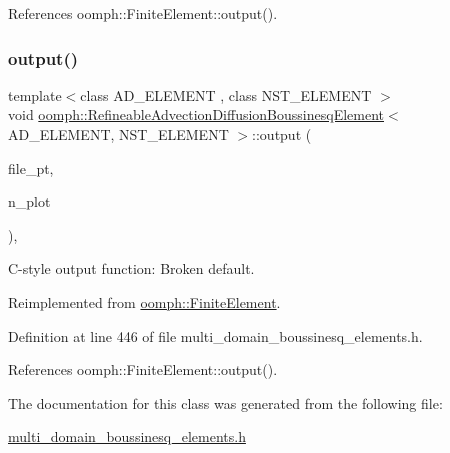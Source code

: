 References oomph\+::\+Finite\+Element\+::output().

\mbox{\label{classoomph_1_1RefineableAdvectionDiffusionBoussinesqElement_a61bcd2e4a50f8e157ca40572b384dcee}} 
\subsubsection{\texorpdfstring{output()}{output()}\hspace{0.1cm}{\footnotesize\ttfamily [4/4]}}
{\footnotesize\ttfamily template$<$class A\+D\+\_\+\+E\+L\+E\+M\+E\+NT , class N\+S\+T\+\_\+\+E\+L\+E\+M\+E\+NT $>$ \\
void \hyperlink{classoomph_1_1RefineableAdvectionDiffusionBoussinesqElement}{oomph\+::\+Refineable\+Advection\+Diffusion\+Boussinesq\+Element}$<$ A\+D\+\_\+\+E\+L\+E\+M\+E\+NT, N\+S\+T\+\_\+\+E\+L\+E\+M\+E\+NT $>$\+::output (\begin{DoxyParamCaption}\item[{F\+I\+LE $\ast$}]{file\+\_\+pt,  }\item[{const unsigned \&}]{n\+\_\+plot }\end{DoxyParamCaption})\hspace{0.3cm}{\ttfamily [inline]}, {\ttfamily [virtual]}}



C-\/style output function\+: Broken default. 



Reimplemented from \hyperlink{classoomph_1_1FiniteElement_adfaee690bb0608f03320eeb9d110d48c}{oomph\+::\+Finite\+Element}.



Definition at line 446 of file multi\+\_\+domain\+\_\+boussinesq\+\_\+elements.\+h.



References oomph\+::\+Finite\+Element\+::output().



The documentation for this class was generated from the following file\+:\begin{DoxyCompactItemize}
\item 
\hyperlink{multi__domain__boussinesq__elements_8h}{multi\+\_\+domain\+\_\+boussinesq\+\_\+elements.\+h}\end{DoxyCompactItemize}
